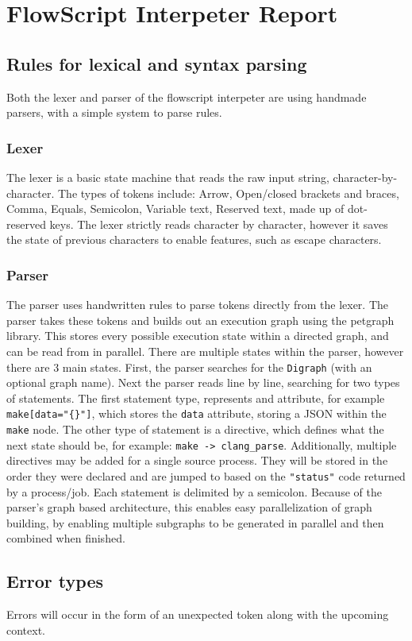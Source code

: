 \documentclass{article}
\begin{document}
\section*{FlowScript Interpeter Report}
	\subsection{Rules for lexical and syntax parsing}
		Both the lexer and parser of the flowscript interpeter are using handmade parsers, with a simple system to parse rules.
		\subsubsection{Lexer}
			The lexer is a basic state machine that reads the raw input string, character-by-character. The types of tokens include: Arrow, Open/closed  brackets and braces, Comma, Equals, Semicolon, Variable text, Reserved text, made up of dot-reserved keys. The lexer strictly reads character by character, however it saves the state of previous characters to enable features, such as escape characters.
		\subsubsection{Parser}
			The parser uses handwritten rules to parse tokens directly from the lexer. The parser takes these tokens and builds out an execution graph using the petgraph library. This stores every possible execution state within a directed graph, and can be read from in parallel. There are multiple states within the parser, however there are 3 main states. First, the parser searches for the \texttt{Digraph} (with an optional graph name). Next the parser reads line by line, searching for two types of statements. The first statement type, represents and attribute, for example \texttt{make[data="\{\}"]}, which stores the \texttt{data} attribute, storing a JSON within the \texttt{make} node. The other type of statement is a directive, which defines what the next state should be, for example: \texttt{make -> clang\_parse}. Additionally, multiple directives may be added for a single source process. They will be stored in the order they were declared and are jumped to based on the \texttt{"status"} code returned by a process/job. Each statement is delimited by a semicolon. Because of the parser's graph based architecture, this enables easy parallelization of graph building, by enabling multiple subgraphs to be generated in parallel and then combined when finished.
	\subsection{Error types}
		Errors will occur in the form of an unexpected token along with the upcoming context. \\ \\
		
\end{document}
